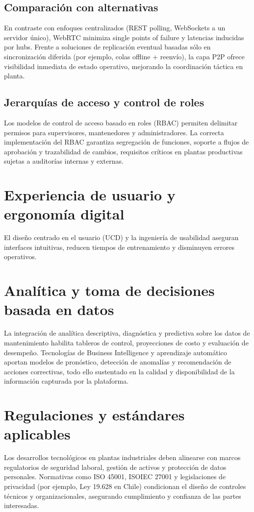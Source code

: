 \documentclass[12pt,a4paper]{report}
\begin{document}
\subsection*{Comparación con alternativas}
En contraste con enfoques centralizados (REST polling, WebSockets a un servidor único), WebRTC minimiza single points of failure y latencias inducidas por hubs. Frente a soluciones de replicación eventual basadas sólo en sincronización diferida (por ejemplo, colas offline + reenvío), la capa P2P ofrece visibilidad inmediata de estado operativo, mejorando la coordinación táctica en planta.

\subsection*{Jerarquías de acceso y control de roles}
Los modelos de control de acceso basado en roles (RBAC) permiten delimitar permisos para supervisores, mantenedores y administradores. La correcta implementación del RBAC garantiza segregación de funciones, soporte a flujos de aprobación y trazabilidad de cambios, requisitos críticos en plantas productivas sujetas a auditorías internas y externas.

\section*{Experiencia de usuario y ergonomía digital}
El diseño centrado en el usuario (UCD) y la ingeniería de usabilidad aseguran interfaces intuitivas, reducen tiempos de entrenamiento y disminuyen errores operativos.

\section*{Analítica y toma de decisiones basada en datos}
La integración de analítica descriptiva, diagnóstica y predictiva sobre los datos de mantenimiento habilita tableros de control, proyecciones de costo y evaluación de desempeño. Tecnologías de Business Intelligence y aprendizaje automático aportan modelos de pronóstico, detección de anomalías y recomendación de acciones correctivas, todo ello sustentado en la calidad y disponibilidad de la información capturada por la plataforma.

\section*{Regulaciones y estándares aplicables}
Los desarrollos tecnológicos en plantas industriales deben alinearse con marcos regulatorios de seguridad laboral, gestión de activos y protección de datos personales. Normativas como ISO 45001, ISO\/IEC 27001 y legislaciones de privacidad (por ejemplo, Ley 19.628 en Chile)\cite{iso45001:2018,iso27001:2022,ley19628} condicionan el diseño de controles técnicos y organizacionales, asegurando cumplimiento y confianza de las partes interesadas.
\end{document}

